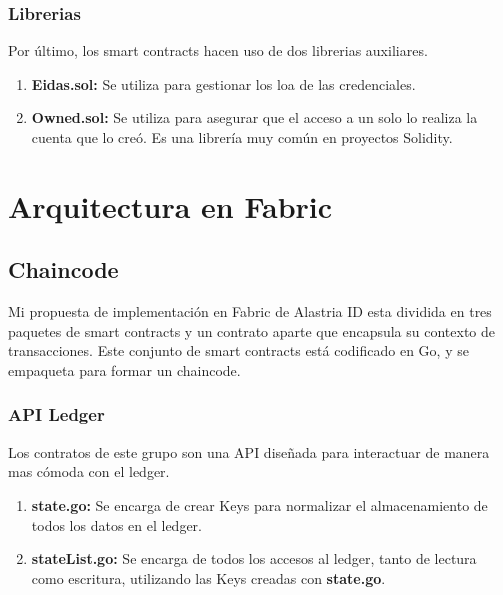 \subsubsection{Librerias}
Por último, los smart contracts hacen uso de dos librerias auxiliares.
\begin{enumerate}
    \item \textbf{Eidas.sol:} Se utiliza para gestionar los \acrshort{loa} de las credenciales.
    \item \textbf{Owned.sol:} Se utiliza para asegurar que el acceso a un solo lo realiza la cuenta que lo creó. Es una librería muy común en proyectos Solidity.
\end{enumerate}
\section{Arquitectura en Fabric}
\subsection{Chaincode}
Mi propuesta de implementación en Fabric de Alastria ID esta dividida en tres paquetes de smart contracts y un contrato aparte que encapsula su contexto de transacciones. Este conjunto de smart contracts está codificado en Go, y se empaqueta para formar un chaincode.
\subsubsection{API Ledger}
Los contratos de este grupo son una API diseñada para interactuar de manera mas cómoda con el ledger.
\begin{enumerate}
    \item \textbf{state.go:} Se encarga de crear Keys para normalizar el almacenamiento de todos los datos en el ledger.
    \item \textbf{stateList.go:} Se encarga de todos los accesos al ledger, tanto de lectura como escritura, utilizando las Keys creadas con \textbf{state.go}.
\end{enumerate}

